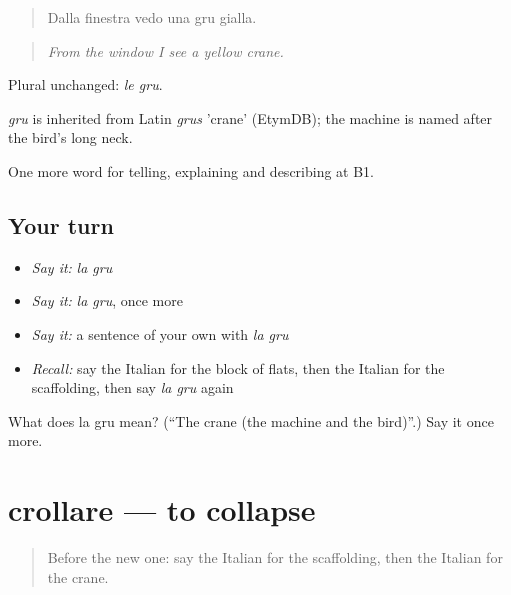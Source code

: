 \begin{quote}
Dalla finestra vedo una gru gialla.
\end{quote}

\begin{quote}
\emph{From the window I see a yellow crane.}
\end{quote}

Plural unchanged: \emph{le gru}.

\begin{cousinweb}
\emph{gru} is inherited from Latin \emph{grus} 'crane' (EtymDB); the machine is named after the bird's long neck.
\end{cousinweb}

\begin{grammarlens}[title={What you've built}]
One more word for telling, explaining and describing at B1.
\end{grammarlens}

\subsection*{Your turn}
\begin{itemize}
\raggedright
  \item \emph{Say it:} \emph{la gru}
  \item \emph{Say it:} \emph{la gru}, once more
  \item \emph{Say it:} a sentence of your own with \emph{la gru}
  \item \emph{Recall:} say the Italian for the block of flats, then the Italian for the scaffolding, then say \emph{la gru} again
\end{itemize}

\begin{tcolorbox}[breakable,colback=teal!4,colframe=teal!35!black,title={Before you move on}]
What does la gru mean? (\textquotedblleft{}The crane (the machine and the bird)\textquotedblright{}.) Say it once more.
\end{tcolorbox}
\section[crollare]{crollare — to collapse}

\label{lesson:IT-C449-crollare}



\begin{quote}
Before the new one: say the Italian for the scaffolding, then the Italian for the crane.
\end{quote}

